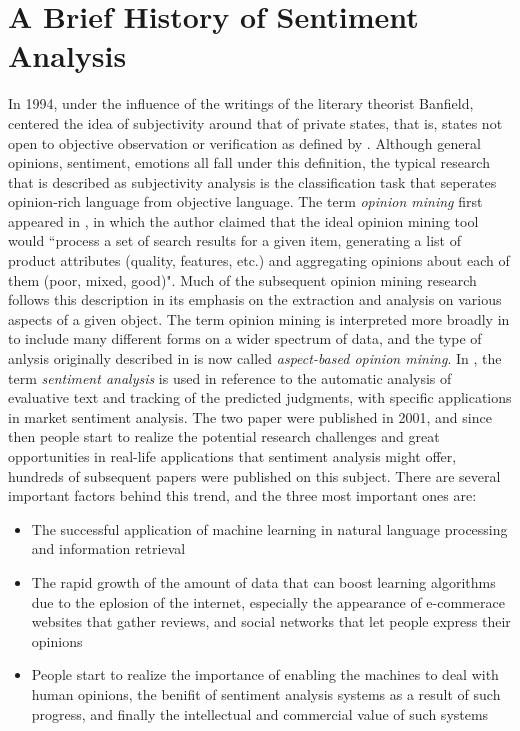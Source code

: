 \section{A Brief History of Sentiment Analysis}

In 1994, under the influence of the writings of the literary theorist Banfield, \cite{wiebe1999development} centered the idea of subjectivity around that of private states, that is, states not open to objective observation or verification as defined by \cite{quirk1985comprehensive}.  Although general opinions, sentiment, emotions all fall under this definition, the typical research that is described as subjectivity analysis is the classification task that seperates opinion-rich language from objective language. The term \emph{opinion mining} first appeared in \cite{dave2003mining}, in which the author claimed that the ideal opinion mining tool would ``process a set of search results for a given item, generating a list of product attributes (quality, features, etc.) and aggregating opinions about each of them (poor, mixed, good)". Much of the subsequent opinion mining research follows this description in its emphasis on the extraction and analysis on various aspects of a given object. The term opinion mining is interpreted more broadly in \cite{liu2007web} to include many different forms on a wider spectrum of data, and the type of anlysis originally described in \cite{dave2003mining} is now called \emph{aspect-based opinion mining}. In \cite{das2001yahoo,tong2001operational}, the term \emph{sentiment analysis} is used in reference to the automatic analysis of evaluative text and tracking of the predicted judgments, with specific applications in market sentiment analysis. The two paper were published in 2001, and since then people start to realize the potential research challenges and great opportunities in real-life applications that sentiment analysis might offer, hundreds of subsequent papers were published on this subject. There are several important factors behind this trend, and the three most important ones are:

\begin{itemize}
    \item The successful application of machine learning in natural language processing and information retrieval
    \item The rapid growth of the amount of data that can boost learning algorithms due to the eplosion of the internet, especially the appearance of e-commerace websites that gather reviews, and social networks that let people express their opinions
    \item People start to realize the importance of enabling the machines to deal with human opinions, the benifit of sentiment analysis systems as a result of such progress, and finally the intellectual and commercial value of such systems
\end{itemize}

